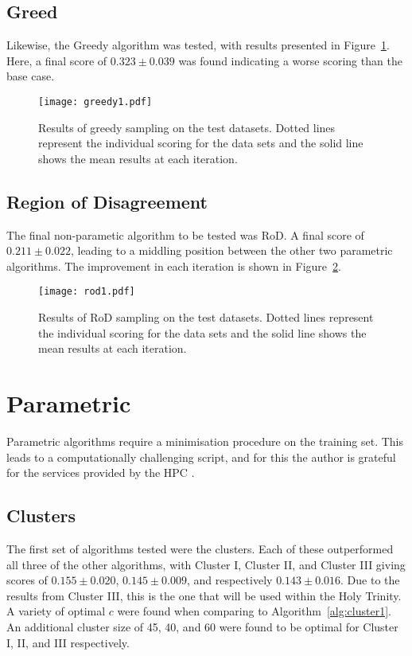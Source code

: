 \subsection{Greed}
Likewise, the Greedy algorithm was tested, with results presented in Figure~\ref{fig:GreedyTestSet}. Here, a final score of ${0.323\pm{}0.039}$ was found indicating a worse scoring than the base case.
\begin{figure}[H]
  \begin{center}
    \texttt{[image: greedy1.pdf]}
    \caption[Greedy]{Results of greedy sampling on the test datasets. Dotted lines represent the individual scoring for the data sets and the solid line shows the mean results at each iteration.}
    \label{fig:GreedyTestSet}
  \end{center}
\end{figure}

\subsection{Region of Disagreement}
The final non-parametic algorithm to be tested was RoD. A final score of ${0.211\pm{}0.022}$, leading to a middling position between the other two parametric algorithms. The improvement in each iteration is shown in Figure~\ref{fig:RODTestSet}.

\begin{figure}[H]
  \begin{center}
    \texttt{[image: rod1.pdf]}
    \caption[RoD]{Results of RoD sampling on the test datasets. Dotted lines represent the individual scoring for the data sets and the solid line shows the mean results at each iteration.}
    \label{fig:RODTestSet}
  \end{center}
\end{figure}

\section{Parametric}
Parametric algorithms require a minimisation procedure on the training set. This leads to a computationally challenging script, and for this the author is grateful for the services provided by the HPC \cite{HPC}.

\subsection{Clusters}
The first set of algorithms tested were the clusters. Each of these outperformed all three of the other algorithms, with Cluster I, Cluster II, and Cluster III giving scores of ${0.155\pm{}0.020}$, ${0.145\pm{}0.009}$, and respectively ${0.143\pm{}0.016}$. Due to the results from Cluster III, this is the one that will be used within the Holy Trinity. A variety of optimal ${c}$ were found when comparing to Algorithm~\ref{alg:cluster1}. An additional cluster size of 45, 40, and 60 were found to be optimal for Cluster I, II, and III respectively.

